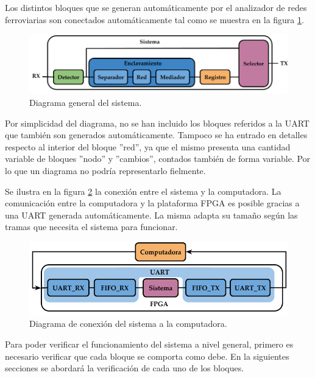 	Los distintos bloques que se generan automáticamente por el analizador de redes ferroviarias son conectados automáticamente tal como se muestra en la figura \ref{fig:Diagrama_general}. 
	
	\begin{figure}[h]
	\centering
	\includegraphics[scale=0.45]{./Figures/Diagrama_general}
		\caption{Diagrama general del sistema.}
		\label{fig:Diagrama_general}
	\end{figure}
	
	
	Por simplicidad del diagrama, no se han incluido los bloques referidos a la UART que también son generados automáticamente. Tampoco se ha entrado en detalles respecto al interior del bloque ''red'', ya que el mismo presenta una cantidad variable de bloques ''nodo'' y ''cambios'', contados también de forma variable. Por lo que un diagrama no podría representarlo fielmente.
	
	Se ilustra en la figura \ref{fig:UART_General} la conexión entre el sistema y la computadora. La comunicación entre la computadora y la plataforma FPGA es posible gracias a una UART generada automáticamente. La misma adapta su tamaño según las tramas que necesita el sistema para funcionar.
	
	\begin{figure}[h]
	\centering
	\includegraphics[scale=0.5]{./Figures/Diagrama_UART_PC}
		\caption{Diagrama de conexión del sistema a la computadora.}
		\label{fig:UART_General}
	\end{figure}
	
	Para poder verificar el funcionamiento del sistema a nivel general, primero es necesario verificar que cada bloque se comporta como debe. En la siguientes secciones se abordará la verificación de cada uno de los bloques.	
				
